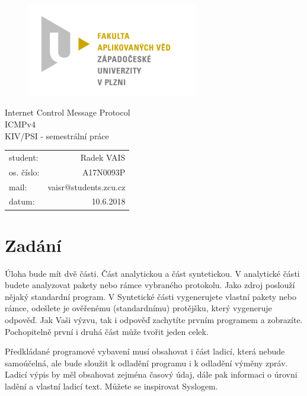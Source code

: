 \documentclass[12pt, a4paper]{article}
\begin{document}
\begin{figure}[h!]
\centering
\includegraphics[bb= 0 0 820 445 , width=75mm]{favlogo.jpg}
\end{figure}

{\centering
{\huge Internet Control Message Protocol}\\[1em]
{\large ICMPv4}\\[1em]
{\large KIV/PSI - semestrální práce}\\[11,5cm]
}

\begin{tabular}{l r}
student: & Radek VAIS\\
os. číslo: & A17N0093P\\
mail: & vaisr@students.zcu.cz\\
datum: & 10.6.2018\\
\end{tabular}

\thispagestyle{empty}
\newpage

\section{Zadání} %

Úloha bude mít dvě části. Část analytickou a část syntetickou. V analytické části budete analyzovat pakety nebo rámce vybraného protokolu. Jako zdroj poslouží nějaký standardní program. V Syntetické části vygenerujete vlastní pakety nebo rámce, odešlete je ověřenému (standardnímu) protějšku, který vygeneruje odpověď. Jak Vaši výzvu, tak i odpověď zachytíte prvním programem a zobrazíte. Pochopitelně první i druhá část může tvořit jeden celek.

Předkládané programové vybavení musí obsahovat i část ladicí, která nebude samoúčelná, ale bude sloužit k odladění programu i k odladění výměny zpráv. Ladicí výpis by měl obsahovat zejména časový údaj, dále pak informaci o úrovni ladění a vlastní ladicí text. Můžete se inspirovat Syslogem.
\end{document}
